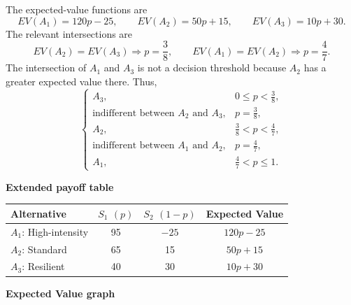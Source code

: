 	The expected-value functions are
	\[
		EV(A_1)=120p-25,\qquad
		EV(A_2)=50p+15,\qquad
		EV(A_3)=10p+30.
	\]
	The relevant intersections are
	\[
		EV(A_2)=EV(A_3)\Rightarrow p=\frac{3}{8},
		\qquad
		EV(A_1)=EV(A_2)\Rightarrow p=\frac{4}{7}.
	\]
	The intersection of $A_1$ and $A_3$ is not a decision threshold because
	$A_2$ has a greater expected value there. Thus,
	\[
		\boxed{
		\begin{cases}
			A_3, & 0\leq p<\frac{3}{8},\\
			\text{indifferent between }A_2\text{ and }A_3,
				& p=\frac{3}{8},\\
			A_2, & \frac{3}{8}<p<\frac{4}{7},\\
			\text{indifferent between }A_1\text{ and }A_2,
				& p=\frac{4}{7},\\
			A_1, & \frac{4}{7}<p\leq1.
		\end{cases}}
	\]

	\textbf{Extended payoff table}
	\begin{center}
		\renewcommand{\arraystretch}{1.4}
		\begin{tabular}{lccc}
			\toprule
			Alternative & $S_1$ $(p)$ & $S_2$ $(1-p)$ & Expected Value \\
			\midrule
			$A_1$: High-intensity & 95 & $-25$ & $120p-25$ \\
			$A_2$: Standard & 65 & 15 & $50p+15$ \\
			$A_3$: Resilient & 40 & 30 & $10p+30$ \\
			\bottomrule
		\end{tabular}
	\end{center}

	\textbf{Expected Value graph}
	\begin{center}
	\end{center}

	
